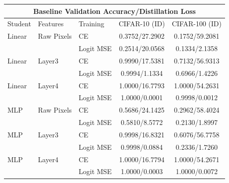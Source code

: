 \documentclass[border=2pt]{standalone}
\begin{document}
\setlength{\tabcolsep}{5pt}
\begin{tabular}{lllcc}
\multicolumn{5}{c}{\textbf{Baseline Validation Accuracy/Distillation Loss}}\\[4pt]
\toprule
Student & Features & Training & CIFAR-10 (ID) & CIFAR-100 (ID) \\
\midrule
Linear & Raw Pixels & CE & 0.3752/27.2902 & 0.1752/59.2081 \\
 &  & Logit MSE & 0.2514/20.0568 & 0.1334/2.1358 \\
\midrule
Linear & Layer3 & CE & 0.9990/17.5381 & 0.7132/56.9313 \\
 &  & Logit MSE & 0.9994/1.1334 & 0.6966/1.4226 \\
\midrule
Linear & Layer4 & CE & 1.0000/16.7793 & 1.0000/54.2631 \\
 &  & Logit MSE & 1.0000/0.0001 & 0.9998/0.0012 \\
\midrule
MLP & Raw Pixels & CE & 0.5686/24.1425 & 0.2962/58.4024 \\
 &  & Logit MSE & 0.5810/8.5772 & 0.2130/1.8997 \\
\midrule
MLP & Layer3 & CE & 0.9998/16.8321 & 0.6076/56.7758 \\
 &  & Logit MSE & 0.9998/0.0884 & 0.2336/1.7260 \\
\midrule
MLP & Layer4 & CE & 1.0000/16.7794 & 1.0000/54.2671 \\
 &  & Logit MSE & 1.0000/0.0003 & 1.0000/0.0072 \\
\bottomrule
\end{tabular}
\end{document}
